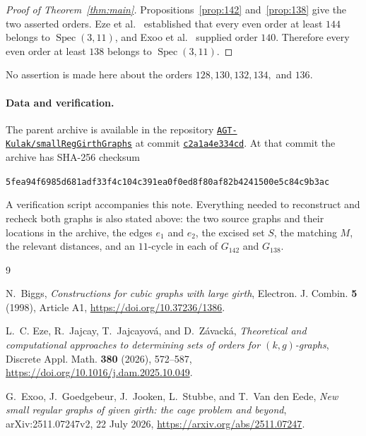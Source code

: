 \documentclass[11pt]{amsart}
\newcommand{\Spec}{\operatorname{Spec}}
\begin{document}
\begin{proof}[Proof of Theorem~\ref{thm:main}]
Propositions~\ref{prop:142} and~\ref{prop:138} give the two asserted
orders. Eze et al.~\cite{EzeEtAl} established that every even order at
least $144$ belongs to $\Spec(3,11)$, and Exoo et al.~\cite{ExooEtAl}
supplied order $140$. Therefore every even order at least $138$ belongs
to $\Spec(3,11)$.
\end{proof}

No assertion is made here about the orders
$128,130,132,134,$ and $136$.

\paragraph{Data and verification.}
The parent archive is available in the repository
\href{https://github.com/AGT-Kulak/smallRegGirthGraphs}%
{\texttt{AGT-Kulak/smallRegGirthGraphs}} at commit
\href{https://github.com/AGT-Kulak/smallRegGirthGraphs/commit/c2a1a4e334cd9f4dd31247f1ebfb6e18c004e4bc}%
{\texttt{c2a1a4e334cd}}. At that commit the archive
 has SHA-256 checksum
\begin{center}
\small\texttt{5fea94f6985d681adf33f4c104c391ea0f0ed8f80af82b4241500e5c84c9b3ac}
\end{center}
A verification script accompanies this note. Everything needed to
reconstruct and recheck both graphs is also stated above: the two source
graphs and their locations in the archive, the edges $e_1$ and $e_2$,
the excised set $S$, the matching $M$, the relevant distances, and an
$11$-cycle in each of $G_{142}$ and $G_{138}$.

\begin{thebibliography}{9}

N.~Biggs,
\emph{Constructions for cubic graphs with large girth},
Electron. J. Combin. \textbf{5} (1998), Article A1,
\url{https://doi.org/10.37236/1386}.

L.~C. Eze, R.~Jajcay, T.~Jajcayov\'a, and D.~Z\'avack\'a,
\emph{Theoretical and computational approaches to determining sets of
orders for $(k,g)$-graphs},
Discrete Appl. Math. \textbf{380} (2026), 572--587,
\url{https://doi.org/10.1016/j.dam.2025.10.049}.

G.~Exoo, J.~Goedgebeur, J.~Jooken, L.~Stubbe, and T.~Van den Eede,
\emph{New small regular graphs of given girth: the cage problem and
beyond},
arXiv:2511.07247v2, 22 July 2026,
\url{https://arxiv.org/abs/2511.07247}.

\end{thebibliography}
\end{document}
